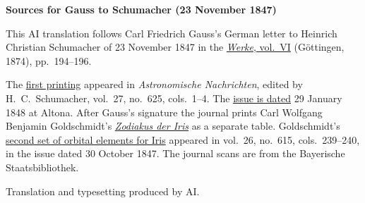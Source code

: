 \clearpage\thispagestyle{empty}
\begin{center}\textbf{Sources for Gauss to Schumacher (23 November 1847)}\end{center}
\noindent This AI translation follows Carl Friedrich Gauss’s German letter to Heinrich Christian Schumacher of 23 November 1847 in the \href{https://gdz.sub.uni-goettingen.de/id/PPN236007467}{\textit{Werke}, vol.~VI} (Göttingen, 1874), pp.~194--196.
\par\smallskip\noindent The \href{https://api.digitale-sammlungen.de/iiif/image/v2/bsb10049452_00009/full/1450,/0/default.jpg}{first printing} appeared in \textit{Astronomische Nachrichten}, edited by H.~C.~Schumacher, vol.~27, no.~625, cols.~1--4. The \href{https://api.digitale-sammlungen.de/iiif/image/v2/bsb10049452_00016/full/1450,/0/default.jpg}{issue is dated} 29 January 1848 at Altona. After Gauss’s signature the journal prints Carl Wolfgang Benjamin Goldschmidt’s \href{https://api.digitale-sammlungen.de/iiif/image/v2/bsb10049452_00010/full/1450,/0/default.jpg}{\textit{Zodiakus der Iris}} as a separate table. Goldschmidt’s \href{https://api.digitale-sammlungen.de/iiif/image/v2/bsb10049451_00128/full/1450,/0/default.jpg}{second set of orbital elements for Iris} appeared in vol.~26, no.~615, cols.~239--240, in the issue dated 30 October 1847. The journal scans are from the Bayerische Staatsbibliothek.
\par\smallskip\noindent Translation and typesetting produced by AI.
\clearpage
